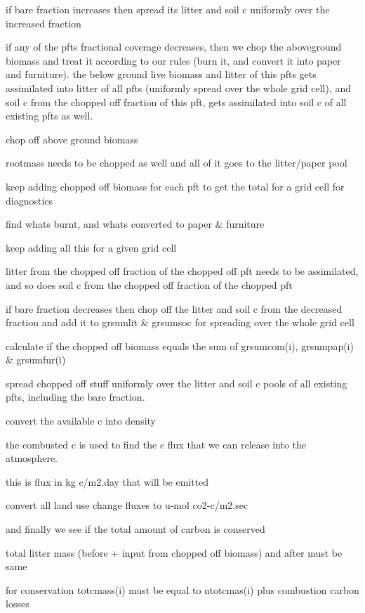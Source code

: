if bare fraction increases then spread its litter and soil c uniformly over the increased fraction

if any of the pfts fractional coverage decreases, then we chop the aboveground biomass and treat it according to our rules (burn it, and convert it into paper and furniture). the below ground live biomass and litter of this pfts gets assimilated into litter of all pfts (uniformly spread over the whole grid cell), and soil c from the chopped off fraction of this pft, gets assimilated into soil c of all existing pfts as well.

chop off above ground biomass

rootmass needs to be chopped as well and all of it goes to the litter/paper pool

keep adding chopped off biomass for each pft to get the total for a grid cell for diagnostics

find what\textquotesingle{}s burnt, and what\textquotesingle{}s converted to paper \& furniture

keep adding all this for a given grid cell

litter from the chopped off fraction of the chopped off pft needs to be assimilated, and so does soil c from the chopped off fraction of the chopped pft

if bare fraction decreases then chop off the litter and soil c from the decreased fraction and add it to grsumlit \& grsumsoc for spreading over the whole grid cell

calculate if the chopped off biomass equals the sum of grsumcom(i), grsumpap(i) \& grsumfur(i)

spread chopped off stuff uniformly over the litter and soil c pools of all existing pfts, including the bare fraction.

convert the available c into density

the combusted c is used to find the c flux that we can release into the atmosphere.

this is flux in kg c/m2.\+day that will be emitted

convert all land use change fluxes to u-\/mol co2-\/c/m2.\+sec

and finally we see if the total amount of carbon is conserved

total litter mass (before + input from chopped off biomass) and after must be same

for conservation totcmass(i) must be equal to ntotcmas(i) plus combustion carbon losses

